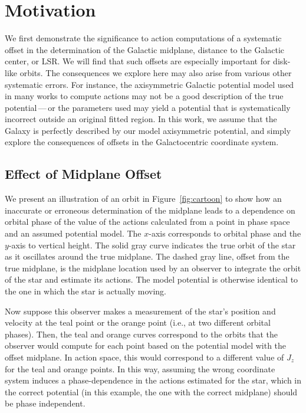 \documentclass[twocolumn]{aastex62}
\begin{document}
\section{Motivation} \label{sec:ref_frame}
We first demonstrate the significance to action computations of a systematic
offset in the determination of the Galactic midplane, distance to the Galactic
center, or LSR. We will find that such offsets are especially important for
disk-like orbits. The consequences we explore here may also arise from various
other systematic errors. For instance, the axisymmetric Galactic potential
model used in many works to compute actions may not be a good description of
the true potential\,---\,or the parameters used may yield a potential that is
systematically incorrect outside an original fitted region. In this work, we
assume that the Galaxy is perfectly described by our model axisymmetric
potential, and simply explore the consequences of offsets in the
Galactocentric coordinate system.

\subsection{Effect of Midplane Offset} \label{ssec:cartoon}
We present an illustration of an orbit in Figure~\ref{fig:cartoon} to show how
an inaccurate or erroneous determination of the midplane leads to a dependence
on orbital phase of the value of the actions calculated from a point in phase
space and an assumed potential model. The $x$-axis corresponds to orbital
phase and the $y$-axis to vertical height. The solid gray curve indicates the
true orbit of the star as it oscillates around the true midplane. The dashed
gray line, offset from the true midplane, is the midplane location used by an
observer to integrate the orbit of the star and estimate its actions. The
model potential is otherwise identical to the one in which the star is
actually moving.

Now suppose this observer makes a measurement of the star's position and
velocity at the teal point or the orange point (i.e., at two different orbital
phases). Then, the teal and orange curves correspond to the orbits that the
observer would compute for each point based on the potential model with the
offset midplane. In action space, this would correspond to a different value
of $J_z$ for the teal and orange points. In this way, assuming the wrong
coordinate system induces a phase-dependence in the actions estimated for the
star, which in the correct potential (in this example, the one with the
correct midplane) should be phase independent.
\end{document}
